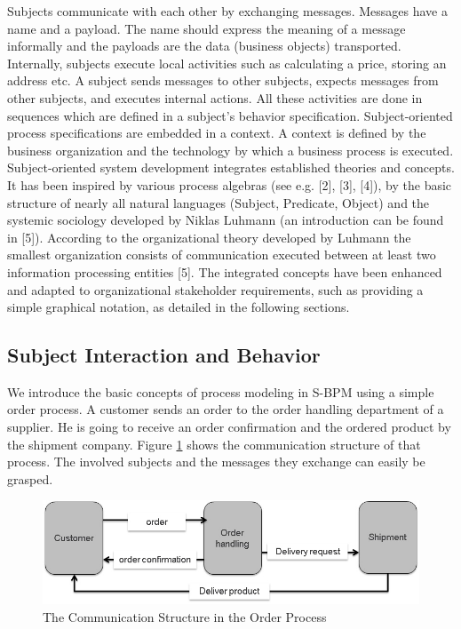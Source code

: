 Subjects communicate with each other by exchanging messages. Messages have a name and a payload. The name should express the meaning of a message informally and the payloads are the data (business objects) transported. Internally, subjects execute local activities such as calculating a price, storing an address etc.
A subject sends messages to other subjects, expects messages from other subjects, and executes internal actions. All these activities are done in sequences which are defined in a subject's behavior specification.
Subject-oriented process specifications are embedded in a context. A context is defined by the business organization and the technology by which a business process is executed.
Subject-oriented system development integrates established theories and concepts. It has been inspired by various process algebras (see e.g. [2], [3], [4]), by the basic structure of nearly all natural languages (Subject, Predicate, Object) and the systemic sociology developed by Niklas Luhmann (an introduction can be found in [5]). According to the organizational theory developed by Luhmann the smallest organization consists of communication executed between at least two information processing entities [5]. The integrated concepts have been enhanced and adapted to organizational stakeholder requirements, such as providing a simple graphical notation, as detailed in the following sections.
\newpage

\subsection{Subject Interaction and Behavior}
We introduce the basic concepts of process modeling in S-BPM using a simple order process. A customer sends an order to the order handling department of a supplier. He is going to receive an order confirmation and the ordered product by the shipment company. Figure \ref{fig:ordercomstructure} shows the communication structure of that process. The involved subjects and the messages they exchange can easily be grasped. 

\begin{figure}[ph]
	\centering
	\includegraphics[width=0.7\linewidth]{20181026-Ontologie-Bilder/Grafiken-Ontologie/SUbjectExecution/OrderComStructure}
	\caption[The Communication Structure in the Order Process]{The Communication Structure in the Order Process}
	\label{fig:ordercomstructure}
\end{figure}

